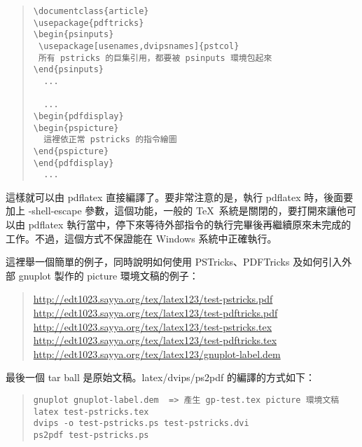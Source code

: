 \begin{quote}
  \begin{verbatim}
\documentclass{article}
\usepackage{pdftricks}
\begin{psinputs}
 \usepackage[usenames,dvipsnames]{pstcol}
 所有 pstricks 的巨集引用，都要被 psinputs 環境包起來
\end{psinputs}
  ...

  ...
\begin{pdfdisplay}
\begin{pspicture}
  這裡依正常 pstricks 的指令繪圖
\end{pspicture}
\end{pdfdisplay}
  ...

\end{verbatim}
\end{quote}

這樣就可以由 {\ttfamily pdflatex} 直接編譯了。要非常注意的是，執行 {\ttfamily pdflatex} 時，後面要加上 {\ttfamily -shell-escape} 參數，這個功能，一般的 \TeX\ 系統是關閉的，要打開來讓他可以由 {\ttfamily pdflatex} 執行當中，停下來等待外部指令的執行完畢後再繼續原來未完成的工作。不過，這個方式不保證能在 Windows 系統中正確執行。

這裡舉一個簡單的例子，同時說明如何使用 {\sffamily PSTricks}、{\sffamily PDFTricks} 及如何引入外部 {\sffamily gnuplot} 製作的 {\ttfamily picture} 環境文稿的例子：

\begin{quote}
  \url{http://edt1023.sayya.org/tex/latex123/test-pstricks.pdf}\\
  \url{http://edt1023.sayya.org/tex/latex123/test-pdftricks.pdf}\\
  \url{http://edt1023.sayya.org/tex/latex123/test-pstricks.tex}\\
  \url{http://edt1023.sayya.org/tex/latex123/test-pdftricks.tex}\\
  \url{http://edt1023.sayya.org/tex/latex123/gnuplot-label.dem}
\end{quote}

最後一個 tar ball 是原始文稿。{\ttfamily latex/dvips/ps2pdf} 的編譯的方式如下：

\begin{quote}
  \begin{verbatim}
gnuplot gnuplot-label.dem  => 產生 gp-test.tex picture 環境文稿
latex test-pstricks.tex
dvips -o test-pstricks.ps test-pstricks.dvi
ps2pdf test-pstricks.ps
\end{verbatim}
\end{quote}

